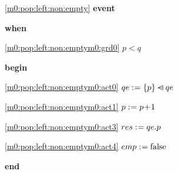 \noindent \ref{m0:pop:left:non:empty}  \textbf{event}
\begin{block}
  \item   \textbf{when}
  \begin{block}
  \item[ \eqref{m0:pop:left:non:emptym0:grd0} ]$p < q $ %
  \end{block}
  \item   \textbf{begin}
  \begin{block}
  \item[ \eqref{m0:pop:left:non:emptym0:act0} ]$qe \mathrel{:\mkern1mu=} \{ p \} \mathbin{\lhd\mkern-14mu-} qe $ %
  \item[ \eqref{m0:pop:left:non:emptym0:act1} ]$p \mathrel{:\mkern1mu=} p\! + \!1 $ %
  \item[ \eqref{m0:pop:left:non:emptym0:act3} ]$res \mathrel{:\mkern1mu=} qe.p $ %
  \item[ \eqref{m0:pop:left:non:emptym0:act4} ]$emp \mathrel{:\mkern1mu=} \text{false} $ %
  \end{block}
  \item   \textbf{end} \\
\end{block}

